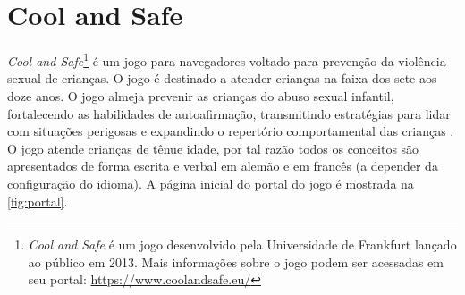 











\section{Cool and Safe}\label{sssec:CeS}

\textit{Cool and Safe}\footnote{\textit{Cool and Safe} é um jogo desenvolvido pela Universidade de Frankfurt lançado ao público em 2013. Mais informações sobre o jogo podem ser acessadas em seu portal: \url{https://www.coolandsafe.eu/}} é um jogo para navegadores voltado para prevenção da violência sexual de crianças. O jogo é destinado a atender crianças na faixa dos sete aos doze anos. O jogo almeja prevenir as crianças do abuso sexual infantil, fortalecendo as habilidades de autoafirmação, transmitindo estratégias para lidar com situações perigosas e expandindo o repertório comportamental das crianças \cite{pajalakasvatustieteiden}. O jogo atende crianças de tênue idade, por tal razão todos os conceitos são apresentados de forma escrita e verbal em alemão e em francês (a depender da configuração do idioma). A página inicial do portal do jogo é mostrada na \autoref{fig:portal}.


